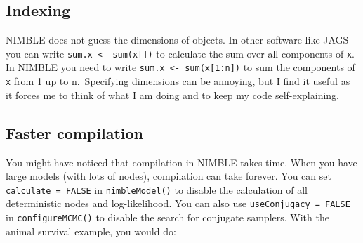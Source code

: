 \documentclass[
  12pt,
]{krantz}
\begin{document}
\hypertarget{indexing}{%
\subsection{Indexing}\label{indexing}}

NIMBLE does not guess the dimensions of objects. In other software like JAGS you can write \texttt{sum.x\ \textless{}-\ sum(x{[}{]})} to calculate the sum over all components of \texttt{x}. In NIMBLE you need to write \texttt{sum.x\ \textless{}-\ sum(x{[}1:n{]})} to sum the components of \texttt{x} from 1 up to n.~Specifying dimensions can be annoying, but I find it useful as it forces me to think of what I am doing and to keep my code self-explaining.

\hypertarget{faster-compilation}{%
\subsection{Faster compilation}\label{faster-compilation}}

You might have noticed that compilation in NIMBLE takes time. When you have large models (with lots of nodes), compilation can take forever. You can set \texttt{calculate\ =\ FALSE} in \texttt{nimbleModel()} to disable the calculation of all deterministic nodes and log-likelihood. You can also use \texttt{useConjugacy\ =\ FALSE} in \texttt{configureMCMC()} to disable the search for conjugate samplers. With the animal survival example, you would do:
\end{document}
